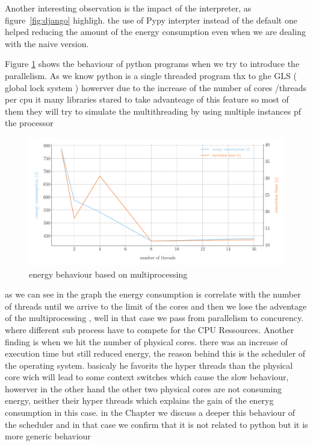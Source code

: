 Another interesting observation is the impact of the interpreter, as figure~\ref{fig:django} highligh. the use of Pypy interpter instead of the default one helped reducing the amount of the energy consumption even when we are dealing with the naive version.

Figure \ref{fig:python_multiprocessing} shows the behaviour of python programs when we try to introduce the parallelism.
As we know python is a single threaded program thx to ghe GLS ( global lock system ) howerver due to the increase of the number of cores /threads per cpu it many libraries stared to take advanteage of this feature so most of them they will try to simulate the multithreading by using multiple instances pf the processor %

\begin{figure}[hbt]
    \centering
    \includegraphics[width=\linewidth]{imgs/multiprocessing_energyvstime}
    \caption{energy behaviour based on multiprocessing}
    \label{fig:python_multiprocessing}
\end{figure}

as we can see in the graph the energy consumption is correlate with the number of threads until we arrive to the limit of the cores and then we lose the adventage of the multiprocessing , well in that case we pass from parallelism to concurency. where different sub process have to compete for the CPU Ressources.
Another finding is when we hit the number of physical cores. there was an increase of execution time but still reduced energy, the reason behind this is the scheduler of the operating system. basicaly he favorits the hyper threads than the physical core wich will lead to some context switches which cause the slow behaviour, howerver in the other hand the other two physical cores are not consuming energy, neither their hyper threads which explains the gain of the eneryg consumption in this case.
in the Chapter %
we discuss a deeper this behaviour of the scheduler and in that case we confirm that it is not related to python but it is more generic behaviour %

